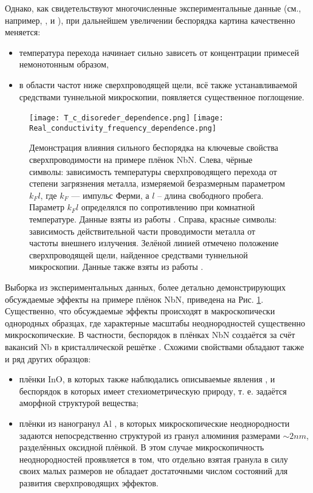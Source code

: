 Однако, как свидетельствуют многочисленные экспериментальные данные (см., например, \cite{Cheng_2016}, \cite{Sherman_2015} и \cite{Pracht_2016}), при дальнейшем увеличении беспорядка картина качественно меняется: 
\begin{itemize}
	\item температура перехода начинает сильно зависеть от концентрации примесей немонотонным образом,
	\item в области частот ниже сверхпроводящей щели, всё также устанавливаемой средствами туннельной микроскопии, появляется существенное поглощение.
\end{itemize}
\begin{figure}[h]
	\label{fig:Impur_Tc_and_radiation_absorb_data}
	\centering
	\texttt{[image: T\_c\_disoreder\_dependence.png]}
	\texttt{[image: Real\_conductivity\_frequency\_dependence.png]}
	\caption{Демонстрация влияния сильного беспорядка на ключевые свойства сверхпроводимости на примере плёнок NbN. Слева, чёрные символы: зависимость температуры сверхпроводящего перехода от степени загрязнения металла, измеряемой безразмерным параметром $k_F l$, где $k_F$ --- импульс Ферми, а $l$ -- длина свободного пробега. Параметр $k_F l$ определялся по сопротивлению при комнатной температуре. Данные взяты из работы \cite{Cheng_2016}. Справа, красные символы: зависимость действительной части проводимости металла от частоты внешнего излучения. Зелёной линией отмечено положение сверхпроводящей щели, найденное средствами туннельной микроскопии. Данные также взяты из работы \cite{Cheng_2016}.}	
\end{figure}
Выборка из экспериментальных данных, более детально демонстрирующих обсуждаемые эффекты на примере плёнок NbN, приведена на Рис. \ref{fig:Impur_Tc_and_radiation_absorb_data}. Существенно, что обсуждаемые эффекты происходят в макроскопически однородных образцах, где характерные масштабы неоднородностей существенно микроскопические. В частности, беспорядок в плёнках NbN создаётся за счёт вакансий Nb в кристаллической решётке \cite{Cheng_2016}. Схожими свойствами обладают также и ряд других образцов:
\begin{itemize} 
	\item плёнки InO, в которых также наблюдались описываемые явления \cite{Sherman_2015}, и беспорядок в которых имеет стехиометрическую природу, т. е. задаётся аморфной структурой вещества;
	\item плёнки из наногранул Al \cite{Pracht_2016}, в которых микроскопические неоднородности задаются непосредственно структурой из гранул алюминия размерами $\sim 2 nm$, разделённых оксидной плёнкой. В этом случае микроскопичность неоднородностей проявляется в том, что отдельно взятая гранула в силу своих малых размеров не обладает достаточными числом состояний для развития сверхпроводящих эффектов.
\end{itemize}

